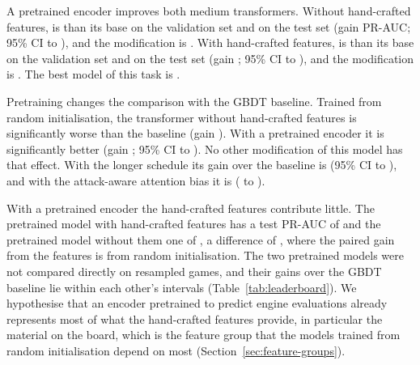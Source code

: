 \documentclass[11pt]{article}
\begin{document}
A pretrained encoder improves both medium transformers. Without hand-crafted
features,  is
 than
its base on the validation set and
 on the
test set (gain 
PR-AUC; 95\% CI
 to
), and
the modification is
. With
hand-crafted features,  is
than its base on the validation set and
on the test set (gain
;
95\% CI
to
),
and the modification is
.
The best model of this task is .

Pretraining changes the comparison with the GBDT baseline. Trained from
random initialisation, the transformer without hand-crafted features is
significantly worse than the baseline (gain
). With a pretrained encoder it is
significantly better (gain ; 95\%
CI  to
).
\ifchangeepochs
No other modification of this model has that effect. With the longer
schedule its gain over the baseline is 
(95\% CI  to
)\ifchangeattacks, and with the
attack-aware attention bias it is 
( to
)\fi.
\fi

With a pretrained encoder the hand-crafted features contribute little. The
pretrained model with hand-crafted features has a test PR-AUC of
 and the pretrained model
without them one of , a
difference of , where
the paired gain from the features is
 from random
initialisation. The two pretrained models were not compared directly on
resampled games, and their gains over the GBDT baseline lie within each
other's intervals (Table~\ref{tab:leaderboard}). We hypothesise that an
encoder pretrained to predict engine evaluations already represents most of
what the hand-crafted features provide\iffeatures, in particular the
material on the board, which is the feature group that the models trained
from random initialisation depend on most
(Section~\ref{sec:feature-groups})\fi.
\end{document}
